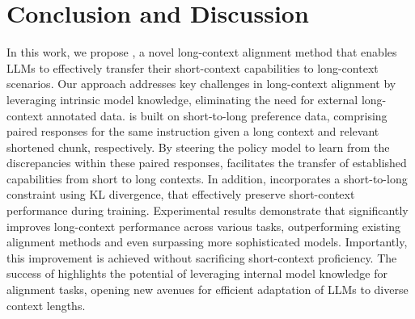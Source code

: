 \section{Conclusion and Discussion}
In this work, we propose \ourMethod{}, a novel long-context alignment method that enables LLMs to effectively transfer their short-context capabilities to long-context scenarios. Our approach addresses key challenges in long-context alignment by leveraging intrinsic model knowledge, eliminating the need for external long-context annotated data. \ourMethod{} is built on short-to-long preference data, comprising paired responses for the same instruction given a long context and relevant shortened chunk, respectively. By steering the policy model to learn from the discrepancies within these paired responses, \ourMethod{} facilitates the transfer of established capabilities from short to long contexts. In addition, \ourMethod{} incorporates a short-to-long constraint using KL divergence, that effectively preserve short-context performance during training.
Experimental results demonstrate that \ourMethod{} significantly improves long-context performance across various tasks, outperforming existing alignment methods and even surpassing more sophisticated models. Importantly, this improvement is achieved without sacrificing short-context proficiency.
The success of \ourMethod{} highlights the potential of leveraging internal model knowledge for alignment tasks, opening new avenues for efficient adaptation of LLMs to diverse context lengths. 


